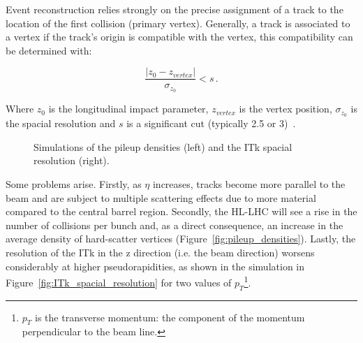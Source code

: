 Event reconstruction relies strongly on the precise assignment of a track to the location of the first collision (primary vertex). %
Generally, a track is associated to a vertex if the track's origin is compatible with the vertex, this compatibility can be determined with:

\begin{equation}\label{eq:compatibility_vertex}
    \frac{\left|z_0 - z_{vertex}\right|}{\sigma_{z_0}} < s \,.
\end{equation}
 
Where \(z_0\) is the longitudinal impact parameter, \(z_{vertex}\) is the vertex position, \(\sigma_{z_0}\) is the spacial resolution and \(s\) is a significant cut (typically 2.5 or 3)~\cite{cernTechnicalDesign}. 

\begin{figure}[h!tbp]
    \centering
    \hfill
    \centering
    \caption{Simulations of the pileup densities (left) and the ITk spacial resolution (right).}
\end{figure}

Some problems arise. 
Firstly, as \(\eta\) increases, tracks become more parallel to the beam and are subject to multiple scattering effects due to more material compared to the central barrel region. Secondly, the HL-LHC will see a rise in the number of collisions per bunch %
 and, as a direct consequence, an increase in the average density of hard-scatter vertices (Figure~\ref{fig:pileup_densities}). Lastly, the resolution of the ITk in the z direction (i.e. the beam direction) worsens considerably at higher pseudorapidities, as shown in the simulation in Figure~\ref{fig:ITk_spacial_resolution} for two values of \(p_T\)\footnote{\(p_T\) is the transverse momentum: the component of the momentum perpendicular to the beam line.}.

